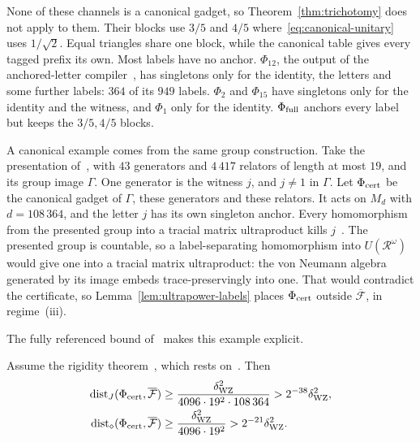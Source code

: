 None of these channels is a canonical gadget, so Theorem~\ref{thm:trichotomy} does not apply to
them. Their blocks use $3/5$ and $4/5$ where~\eqref{eq:canonical-unitary} uses $1/\sqrt2$. Equal
triangles share one block, while the canonical table gives every tagged prefix its own. Most labels
have no anchor. $\Phi_{12}$, the output of the anchored-letter
compiler~\cite[Definition~3.1]{MghirbiDouglasD}, has singletons only for the identity, the letters and
some further labels: $364$ of its $949$ labels. $\Phi_2$ and $\Phi_{15}$ have singletons only for the
identity and the witness, and $\Phi_1$ only for the identity. $\Phi_{\rm full}$ anchors every label but
keeps the $3/5,4/5$ blocks.

A canonical example comes from the same group construction. Take the presentation
of~\cite[Section~7]{MghirbiDouglasD}, with $43$ generators and $4\,417$ relators of length at most
$19$, and its group image $\Gamma$. One generator is the witness $j$, and $j\ne1$ in $\Gamma$. Let
$\Phi_{\rm cert}$ be the canonical gadget of $\Gamma$, these generators and these relators. It acts on
$M_d$ with $d=108\,364$, and the letter $j$ has its own singleton anchor. Every homomorphism from the
presented group into a tracial matrix ultraproduct kills $j$~\cite[Theorem~1]{MghirbiDouglasDv1}. The
presented group is countable, so a label-separating homomorphism into $U(\mathcal R^\omega)$ would give
one into a tracial matrix ultraproduct: the von Neumann algebra generated by its image embeds
trace-preservingly into one. That would contradict the certificate, so
Lemma~\ref{lem:ultrapower-labels} places $\Phi_{\rm cert}$ outside $\overline{\mathcal F}$, in
regime~(iii).

The fully referenced bound of~\cite{MghirbiDouglasD} makes this example explicit.

\begin{proposition}\label{prop:explicit-canonical}
Assume the rigidity theorem~\cite[Theorem~D.4]{MghirbiDouglasD}, which rests on~\cite{WangZhi2026}.
Then
\begin{align*}
 \operatorname{dist}_J(\Phi_{\rm cert},\overline{\mathcal F})&\ge\frac{\delta_{\rm WZ}^2}{4096\cdot19^2\cdot108\,364}>2^{-38}\delta_{\rm WZ}^2,\\
 \operatorname{dist}_\diamond(\Phi_{\rm cert},\overline{\mathcal F})&\ge\frac{\delta_{\rm WZ}^2}{4096\cdot19^2}>2^{-21}\delta_{\rm WZ}^2.
\end{align*}
\end{proposition}

